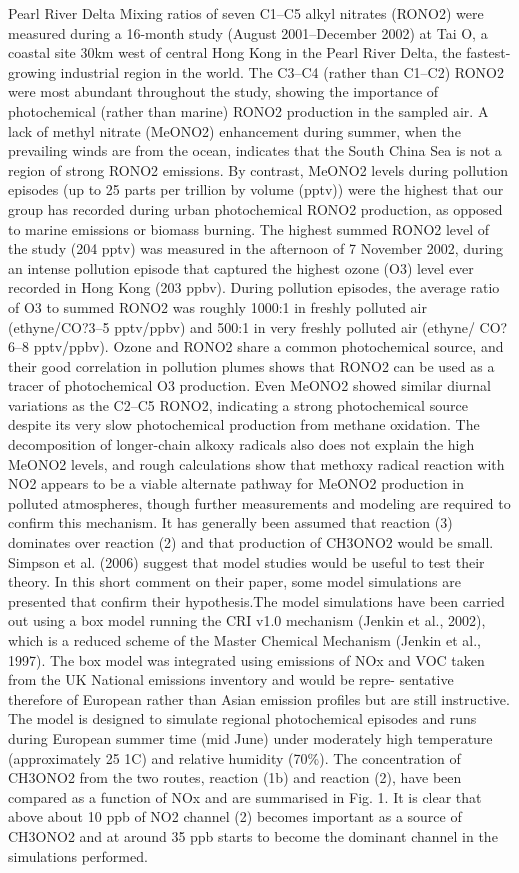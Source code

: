 \documentclass[11pt,a4paper]{article}
\begin{document}
\citep{Simpson2006} Pearl River Delta
Mixing ratios of seven C1–C5 alkyl nitrates (RONO2) were measured during a 16-month study (August 2001–December
2002) at Tai O, a coastal site 30km west of central Hong Kong in the Pearl River Delta, the fastest-growing industrial region in the world. The C3–C4 (rather than C1–C2) RONO2 were most abundant throughout the study, showing the importance of photochemical (rather than marine) RONO2 production in the sampled air. A lack of methyl nitrate (MeONO2) enhancement during summer, when the prevailing winds are from the ocean, indicates that the South China Sea is not a region of strong RONO2 emissions. By contrast, MeONO2 levels during pollution episodes (up to 25 parts per trillion by volume (pptv)) were the highest that our group has recorded during urban photochemical RONO2 production, as opposed to marine emissions or biomass burning. The highest summed RONO2 level of the study (204 pptv) was measured in the afternoon of 7 November 2002, during an intense pollution episode that captured the highest ozone (O3) level ever recorded in Hong Kong (203 ppbv). During pollution episodes, the average ratio of O3 to summed RONO2 was
roughly 1000:1 in freshly polluted air (ethyne/CO?3–5 pptv/ppbv) and 500:1 in very freshly polluted air (ethyne/ CO?6–8 pptv/ppbv). Ozone and RONO2 share a common photochemical source, and their good correlation in pollution plumes shows that RONO2 can be used as a tracer of photochemical O3 production. Even MeONO2 showed similar
diurnal variations as the C2–C5 RONO2, indicating a strong photochemical source despite its very slow photochemical production from methane oxidation. The decomposition of longer-chain alkoxy radicals also does not explain the high MeONO2 levels, and rough calculations show that methoxy radical reaction with NO2 appears to be a viable alternate pathway for MeONO2 production in polluted atmospheres, though further measurements and modeling are required to confirm this mechanism.
\citep{Comment}
It has generally been assumed that reaction (3) dominates over reaction (2) and that production of CH3ONO2 would be small. Simpson et al. (2006) suggest that model studies would be useful to test their theory. In this short comment on their paper, some model simulations are presented that confirm their hypothesis.The model simulations have been carried out using a box model running the CRI v1.0 mechanism (Jenkin et al., 2002), which is a reduced scheme of the Master Chemical Mechanism (Jenkin et al., 1997). The box model was integrated using emissions of NOx and VOC taken from the UK National emissions inventory and would be repre- sentative therefore of European rather than Asian emission profiles but are still instructive. The model is designed to simulate regional photochemical episodes and runs during European summer time (mid June) under moderately high temperature (approximately 25 1C) and relative humidity (70\%). The concentration of CH3ONO2 from the two routes, reaction (1b) and reaction (2), have been compared as a function of NOx and are summarised in Fig. 1. It is clear that above about 10 ppb of NO2 channel (2) becomes important as a source of CH3ONO2 and at around 35 ppb starts to become the dominant channel in the simulations performed.
\end{document}
